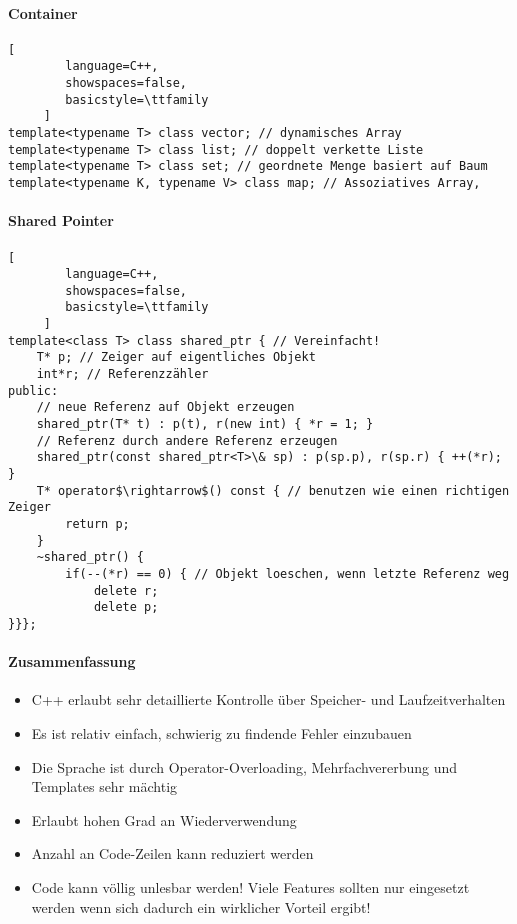 \documentclass[10pt]{article}
\begin{document}
\paragraph{Container}
\begin{lstlisting}[
        language=C++,
        showspaces=false,
        basicstyle=\ttfamily
     ]
template<typename T> class vector; // dynamisches Array
template<typename T> class list; // doppelt verkette Liste
template<typename T> class set; // geordnete Menge basiert auf Baum
template<typename K, typename V> class map; // Assoziatives Array,
\end{lstlisting}


\paragraph{Shared Pointer}
\begin{lstlisting}[
        language=C++,
        showspaces=false,
        basicstyle=\ttfamily
     ]
template<class T> class shared_ptr { // Vereinfacht!
    T* p; // Zeiger auf eigentliches Objekt
    int*r; // Referenzzähler
public:
    // neue Referenz auf Objekt erzeugen
    shared_ptr(T* t) : p(t), r(new int) { *r = 1; }
    // Referenz durch andere Referenz erzeugen
    shared_ptr(const shared_ptr<T>\& sp) : p(sp.p), r(sp.r) { ++(*r); }
    T* operator$\rightarrow$() const { // benutzen wie einen richtigen Zeiger
        return p;
    }
    ~shared_ptr() {
        if(--(*r) == 0) { // Objekt loeschen, wenn letzte Referenz weg
            delete r;
            delete p;
}}};
\end{lstlisting}

\paragraph{Zusammenfassung}
\begin{itemize}
  \item C++ erlaubt sehr detaillierte Kontrolle über Speicher- und Laufzeitverhalten
  \item Es ist relativ einfach, schwierig zu findende Fehler einzubauen
  \item Die Sprache ist durch Operator-Overloading, Mehrfachvererbung und Templates sehr mächtig
  \item Erlaubt hohen Grad an Wiederverwendung
  \item Anzahl an Code-Zeilen kann reduziert werden
  \item Code kann völlig unlesbar werden! Viele Features sollten nur eingesetzt werden wenn sich dadurch ein wirklicher Vorteil ergibt!
\end{itemize}
\end{document}

